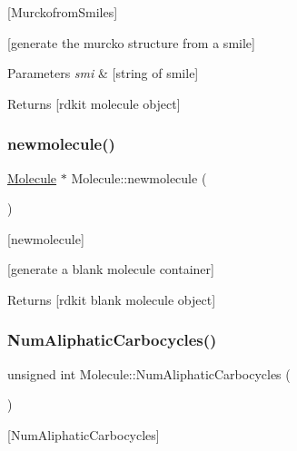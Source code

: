 \mbox{[}Murckofrom\+Smiles\mbox{]} 

\mbox{[}generate the murcko structure from a smile\mbox{]}


\begin{DoxyParams}{Parameters}
{\em smi} & \mbox{[}string of smile\mbox{]} \\
\hline
\end{DoxyParams}
\begin{DoxyReturn}{Returns}
\mbox{[}rdkit molecule object\mbox{]} 
\end{DoxyReturn}
\mbox{\label{class_molecule_ab7813a959f80b5291f43f6b84b775ff5}} 
\subsubsection{\texorpdfstring{newmolecule()}{newmolecule()}}
{\footnotesize\ttfamily \mbox{\hyperlink{class_molecule}{Molecule}} $\ast$ Molecule\+::newmolecule (\begin{DoxyParamCaption}{ }\end{DoxyParamCaption})\hspace{0.3cm}{\ttfamily [static]}}



\mbox{[}newmolecule\mbox{]} 

\mbox{[}generate a blank molecule container\mbox{]}

\begin{DoxyReturn}{Returns}
\mbox{[}rdkit blank molecule object\mbox{]} 
\end{DoxyReturn}
\mbox{\label{class_molecule_a4953b86e7456967bb605bdb61c15b1aa}} 
\subsubsection{\texorpdfstring{Num\+Aliphatic\+Carbocycles()}{NumAliphaticCarbocycles()}}
{\footnotesize\ttfamily unsigned int Molecule\+::\+Num\+Aliphatic\+Carbocycles (\begin{DoxyParamCaption}{ }\end{DoxyParamCaption})}



\mbox{[}Num\+Aliphatic\+Carbocycles\mbox{]} 


